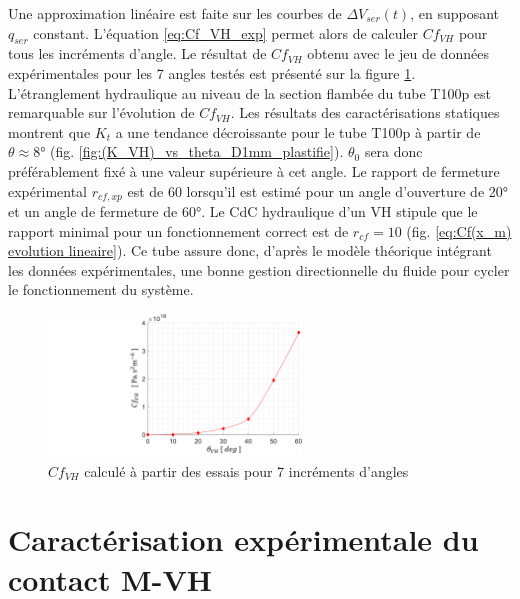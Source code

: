 Une approximation linéaire est faite sur les courbes de $\Delta V_{ser}(t)$, en supposant $q_{ser}$ constant. L'équation \ref{eq:Cf_VH_exp} permet alors de calculer $Cf_{VH}$ pour tous les incréments d'angle. Le résultat de $Cf_{VH}$ obtenu avec le jeu de données expérimentales pour les 7 angles testés est présenté sur la figure \ref{fig:resultats_essais_hydraulique_VH_D1mm}. L'étranglement hydraulique au niveau de la section flambée du tube T100p est remarquable sur l'évolution de $Cf_{VH}$. Les résultats des caractérisations statiques montrent que $K_t$ a une tendance décroissante pour le tube T100p à partir de $\theta\approx\ang{8}$ (fig. \ref{fig:(K_VH)_vs_theta_D1mm_plastifie}). $\theta_0$ sera donc préférablement fixé à une valeur supérieure à cet angle. Le rapport de fermeture expérimental $r_{cf,xp}$ est de 60 lorsqu'il est estimé pour un angle d'ouverture de \ang{20} et un angle de fermeture de \ang{60}. Le CdC hydraulique d'un VH stipule que le rapport minimal pour un fonctionnement correct est de $r_{cf}=10$ (fig. \ref{eq:Cf(x_m) evolution lineaire}). Ce tube assure donc, d'après le modèle théorique intégrant les données expérimentales, une bonne gestion directionnelle du fluide pour cycler le fonctionnement du système. 
\begin{figure}[!htbp]
	\begin{center}
		\captionsetup{justification=centering}
		\includegraphics[trim={10cm 0cm 0cm 0cm},clip,width=0.6\textwidth]{../Chap4/Figure/resultats_essais_hydraulique_VH_D1mm.pdf}
		\caption{$Cf_{VH}$ calculé à partir des essais pour 7 incréments d'angles}
		\label{fig:resultats_essais_hydraulique_VH_D1mm}
	\end{center}
\end{figure}

\section{Caractérisation expérimentale du contact M-VH}
\label{sec:4.3_Caractérisations expérimentale du contact M-VH}
